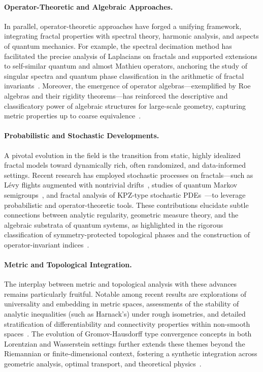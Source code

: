 \documentclass[sigconf]{acmart}
\begin{document}
\paragraph{Operator-Theoretic and Algebraic Approaches.}

In parallel, operator-theoretic approaches have forged a unifying framework, integrating fractal properties with spectral theory, harmonic analysis, and aspects of quantum mechanics. For example, the spectral decimation method has facilitated the precise analysis of Laplacians on fractals and supported extensions to self-similar quantum and almost Mathieu operators, anchoring the study of singular spectra and quantum phase classification in the arithmetic of fractal invariants~\cite{ref69,ref70,ref34}. Moreover, the emergence of operator algebras---exemplified by Roe algebras and their rigidity theorems---has reinforced the descriptive and classificatory power of algebraic structures for large-scale geometry, capturing metric properties up to coarse equivalence~\cite{ref52,ref80}.

\paragraph{Probabilistic and Stochastic Developments.}

A pivotal evolution in the field is the transition from static, highly idealized fractal models toward dynamically rich, often randomized, and data-informed settings. Recent research has employed stochastic processes on fractals---such as Lévy flights augmented with nontrivial drifts~\cite{ref4}, studies of quantum Markov semigroups~\cite{ref90}, and fractal analysis of KPZ-type stochastic PDEs~\cite{ref95}---to leverage probabilistic and operator-theoretic tools. These contributions elucidate subtle connections between analytic regularity, geometric measure theory, and the algebraic substrata of quantum systems, as highlighted in the rigorous classification of symmetry-protected topological phases and the construction of operator-invariant indices~\cite{ref66,ref67,ref68}.

\paragraph{Metric and Topological Integration.}

The interplay between metric and topological analysis with these advances remains particularly fruitful. Notable among recent results are explorations of universality and embedding in metric spaces, assessments of the stability of analytic inequalities (such as Harnack's) under rough isometries, and detailed stratification of differentiability and connectivity properties within non-smooth spaces~\cite{ref50,ref53,ref54,ref81}. The evolution of Gromov-Hausdorff type convergence concepts in both Lorentzian and Wasserstein settings further extends these themes beyond the Riemannian or finite-dimensional context, fostering a synthetic integration across geometric analysis, optimal transport, and theoretical physics~\cite{ref78,ref107,ref108}.
\end{document}

